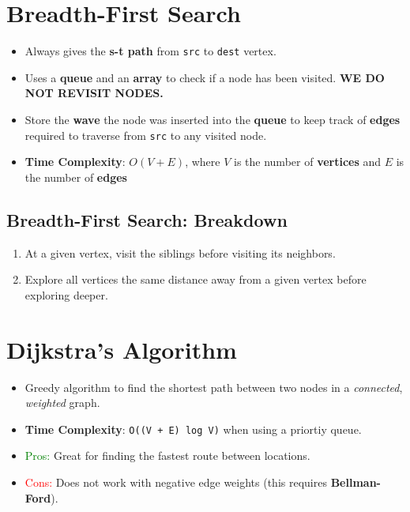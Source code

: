 \documentclass[12pt, letterpaper]{article}
\begin{document}
\section*{Breadth-First Search}

\begin{itemize}
    \item Always gives the \textbf{s-t path} from \texttt{src} to \texttt{dest} vertex.
    \item Uses a \textbf{queue} and an \textbf{array} to check if a node has been visited. \textbf{WE DO NOT REVISIT NODES.}
    \item Store the \textbf{wave} the node was inserted into the \textbf{queue} to keep track of \textbf{edges} required to traverse from \texttt{src} to any visited node.
    \item \textbf{Time Complexity}: $ O(V + E) $, where $ V $ is the number of \textbf{vertices} and $ E $ is the number of \textbf{edges}
\end{itemize}

\subsection*{Breadth-First Search: Breakdown}

\begin{enumerate}
    \item At a given vertex, visit the siblings before visiting its neighbors.
    \item Explore all vertices the same distance away from a given vertex before exploring deeper.
\end{enumerate}

\section*{Dijkstra's Algorithm}

\begin{itemize}
    \item Greedy algorithm to find the shortest path between two nodes in a \textit{connected}, \textit{weighted} graph.
    \item \textbf{Time Complexity}: \texttt{O((V + E) log V)} when using a priortiy queue.
    \item \textcolor{green}{Pros:} Great for finding the fastest route between locations.
    \item \textcolor{red}{Cons:} Does not work with negative edge weights (this requires \textbf{Bellman-Ford}).
\end{itemize}
\end{document}
